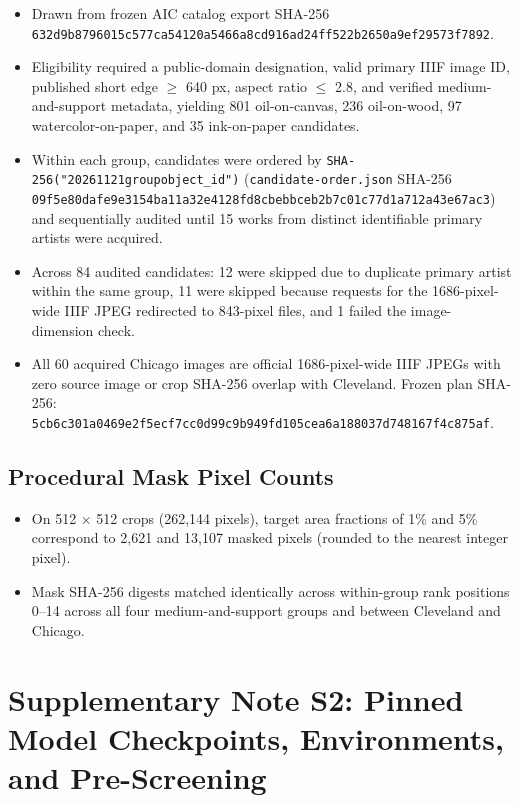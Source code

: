 \documentclass[11pt,a4paper]{article}
\providecommand{\tightlist}{\setlength{\itemsep}{0pt}\setlength{\parskip}{0pt}}
\begin{document}
\begin{itemize}
\tightlist
\item
  Drawn from frozen AIC catalog export SHA-256 \nolinkurl{632d9b8796015c577ca54120a5466a8cd916ad24ff522b2650a9ef29573f7892}.
\item
  Eligibility required a public-domain designation, valid primary IIIF image ID, published short edge \ensuremath{\geq} 640 px, aspect ratio \ensuremath{\leq} 2.8, and verified medium-and-support metadata, yielding 801 oil-on-canvas, 236 oil-on-wood, 97 watercolor-on-paper, and 35 ink-on-paper candidates.
\item
  Within each group, candidates were ordered by \texttt{SHA-256("20261121\textbar{}group\textbar{}object\_id")} (\texttt{candidate-order.json} SHA-256 \nolinkurl{09f5e80dafe9e3154ba11a32e4128fd8cbebbceb2b7c01c77d1a712a43e67ac3}) and sequentially audited until 15 works from distinct identifiable primary artists were acquired.
\item
  Across 84 audited candidates: 12 were skipped due to duplicate primary artist within the same group, 11 were skipped because requests for the 1686-pixel-wide IIIF JPEG redirected to 843-pixel files, and 1 failed the image-dimension check.
\item
  All 60 acquired Chicago images are official 1686-pixel-wide IIIF JPEGs with zero source image or crop SHA-256 overlap with Cleveland. Frozen plan SHA-256: \nolinkurl{5cb6c301a0469e2f5ecf7cc0d99c9b949fd105cea6a188037d748167f4c875af}.
\end{itemize}

\subsection{Procedural Mask Pixel Counts}\label{procedural-mask-pixel-counts}

\begin{itemize}
\tightlist
\item
  On 512 \ensuremath{\times} 512 crops (262,144 pixels), target area fractions of 1\% and 5\% correspond to 2,621 and 13,107 masked pixels (rounded to the nearest integer pixel).
\item
  Mask SHA-256 digests matched identically across within-group rank positions 0--14 across all four medium-and-support groups and between Cleveland and Chicago.
\end{itemize}

\section{Supplementary Note S2: Pinned Model Checkpoints, Environments, and Pre-Screening}\label{supplementary-note-s2-pinned-model-checkpoints-environments-and-pre-screening}
\end{document}
